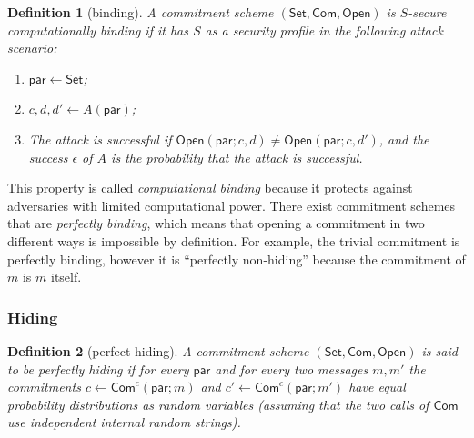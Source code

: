 \documentclass{article}
\newtheorem{definition}{Definition}[section]
\newcommand{\setup}[0]{\mathsf{Set}}
\newcommand{\commit}[0]{\mathsf{Com}}
\newcommand{\open}[0]{\mathsf{Open}}
\newcommand{\commitc}[0]{\mathsf{Com}^{c}}
\newcommand{\param}[0]{\mathsf{par}}
\begin{document}
\begin{definition}[binding]
A commitment scheme $(\setup, \commit, \open)$ is $S$-secure computationally binding if it has $S$ as a security profile in the following attack scenario:
\begin{enumerate}
\item $\param\gets\setup$;
\item $c,d,d'\gets A(\param)$;
\item The attack is successful if $\open(\param; c, d)\neq\open(\param; c, d')$,
and the success $\epsilon$ of $A$ is the probability that the attack is successful.
\end{enumerate}
\end{definition}

\noindent This property is called \emph{computational binding} because it protects against adversaries with limited computational power. There exist commitment schemes that are \emph{perfectly binding}, which means that opening a commitment in two different ways is impossible by definition. For example, the trivial commitment is perfectly binding, however it is ``perfectly non-hiding'' because the commitment of $m$ is $m$ itself.

\subsubsection{Hiding}

\begin{definition}[perfect hiding]
A commitment scheme $(\setup, \commit, \open)$ is said to be perfectly hiding if for every $\param$ and for every two messages $m,m'$ the commitments $c\gets \commitc(\param; m)$ and $c'\gets \commitc(\param; m')$ have equal probability distributions as random variables (assuming that the two calls of $\commit$ use independent internal random strings).
\end{definition}
\end{document}
